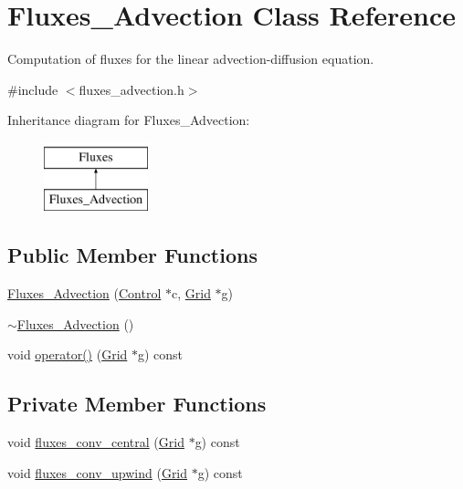 \hypertarget{class_fluxes___advection}{}\section{Fluxes\+\_\+\+Advection Class Reference}
\label{class_fluxes___advection}


Computation of fluxes for the linear advection-\/diffusion equation.  




{\ttfamily \#include $<$fluxes\+\_\+advection.\+h$>$}

Inheritance diagram for Fluxes\+\_\+\+Advection\+:\begin{figure}[H]
\begin{center}
\leavevmode
\includegraphics[height=2.000000cm]{class_fluxes___advection}
\end{center}
\end{figure}
\subsection*{Public Member Functions}
\begin{DoxyCompactItemize}
\item 
\hyperlink{class_fluxes___advection_a24b69e1dba304f7267df903d9475c3d3}{Fluxes\+\_\+\+Advection} (\hyperlink{class_control}{Control} $\ast$c, \hyperlink{class_grid}{Grid} $\ast$g)
\item 
\hyperlink{class_fluxes___advection_a4fcf0d50fb99dbe44b0718a9065e2618}{$\sim$\+Fluxes\+\_\+\+Advection} ()
\item 
void \hyperlink{class_fluxes___advection_a3e464c726fac986b627af81975b2ad68}{operator()} (\hyperlink{class_grid}{Grid} $\ast$g) const 
\end{DoxyCompactItemize}
\subsection*{Private Member Functions}
\begin{DoxyCompactItemize}
\item 
void \hyperlink{class_fluxes___advection_aaf2de2525ef3dcafe15afd814fa2f4be}{fluxes\+\_\+conv\+\_\+central} (\hyperlink{class_grid}{Grid} $\ast$g) const 
\item 
void \hyperlink{class_fluxes___advection_a4f6e8629d5120b16763aa07b5189b38b}{fluxes\+\_\+conv\+\_\+upwind} (\hyperlink{class_grid}{Grid} $\ast$g) const 
\end{DoxyCompactItemize}
